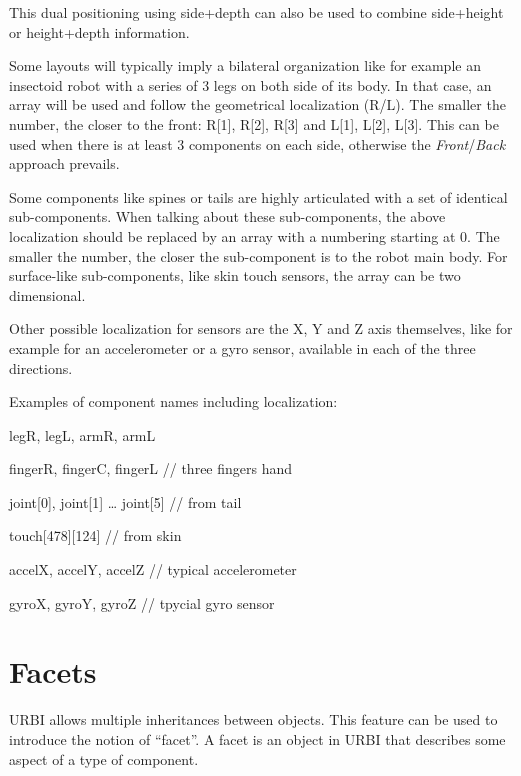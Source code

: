 \documentclass[a4paper]{article}
\begin{document}
{\centering
\par}

{\sffamily
This dual positioning using side+depth can also be used to combine
side+height or height+depth information.}

{\sffamily
Some layouts will typically imply a bilateral organization like for
example an insectoid robot with a series of 3 legs on both side of its
body. In that case, an array will be used and follow the geometrical
localization (R/L). The smaller the number, the closer to the front:
R[1], R[2], R[3] and L[1], L[2], L[3]. This can be used when there is
at least 3 components on each side, otherwise the
\textit{Front}/\textit{Back} approach prevails.}

{\sffamily
Some components like spines or tails are highly articulated with a set
of identical sub-components. When talking about these sub-components,
the above localization should be replaced by an array with a numbering
starting at 0. The smaller the number, the closer the sub-component is
to the robot main body. For surface-like sub-components, like skin
touch sensors, the array can be two dimensional.}

{\sffamily
Other possible localization for sensors are the X, Y and Z axis
themselves, like for example for an accelerometer or a gyro sensor,
available in each of the three directions.}

{\sffamily
Examples of component names including localization:}

{
legR, legL, armR, armL}

{
fingerR, fingerC, fingerL // three fingers hand}

{
joint[0], joint[1] … joint[5] // from tail}

{
touch[478][124] // from skin}

{
accelX, accelY, accelZ // typical accelerometer}

{
gyroX, gyroY, gyroZ // tpycial gyro sensor}

\section[]{}
\section[Facets]{Facets}
{\sffamily
URBI allows multiple inheritances between objects. This feature can be
used to introduce the notion of “facet”. A facet is an object in URBI
that describes some aspect of a type of component. }
\end{document}
